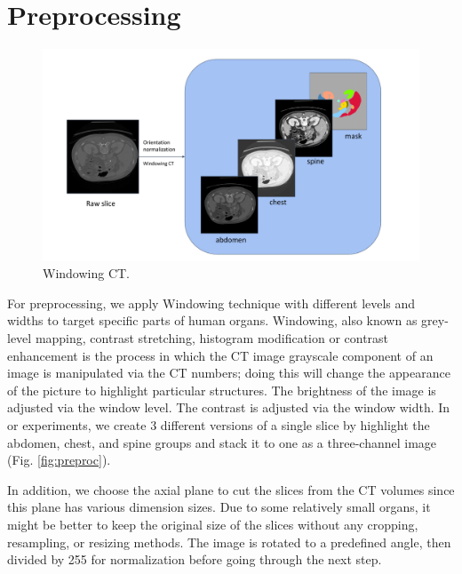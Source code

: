 \section{Preprocessing}
\label{sec:preprocess}
\begin{figure}[!htb]
    \centering
    \includegraphics[width=\textwidth]{resources/new_images/preproc.pdf}
    \caption{Windowing CT.}
    \label{fig:windowingct}
\end{figure}

For preprocessing, we apply Windowing technique  \cite{windowingct17yahya} with different levels and widths to target specific parts of human organs. Windowing, also known as grey-level mapping, contrast stretching, histogram modification or contrast enhancement is the process in which the CT image grayscale component of an image is manipulated via the CT numbers; doing this will change the appearance of the picture to highlight particular structures. The brightness of the image is adjusted via the window level. The contrast is adjusted via the window width. In or experiments, we create 3 different versions of a single slice by highlight the abdomen, chest, and spine groups and stack it to one as a three-channel image (Fig. \ref{fig:preproc}). 

In addition, we choose the axial plane to cut the slices from the CT volumes since this plane has various dimension sizes. 
Due to some relatively small organs, it might be better to keep the original size of the slices without any cropping, resampling, or resizing methods.
The image is rotated to a predefined angle, then divided by 255 for normalization before going through the next step.